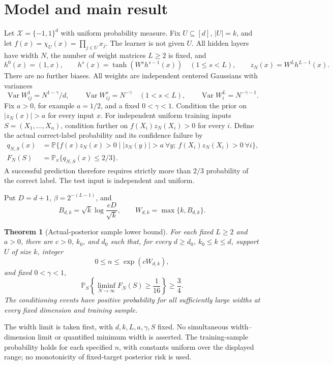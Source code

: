 \documentclass[11pt]{article}
\newtheorem{theorem}{Theorem}[section]
\theoremstyle{remark}\newtheorem{remark}[theorem]{Remark}
\DeclareMathOperator{\Var}{Var}
\begin{document}
\section{Model and main result}
Let $\mathcal X=\{-1,1\}^d$ with uniform probability measure.
Fix $U\subseteq[d]$, $|U|=k$, and let
$f(x)=\chi_U(x)=\prod_{j\in U}x_j$.
The learner is not given $U$. All hidden layers have width $N$, the
number of weight matrices $L\ge2$ is fixed, and
\[
 h^0(x)=(1,x),\qquad
 h^s(x)=\tanh(W^s h^{s-1}(x))\quad(1\le s<L),\qquad
 z_N(x)=W^L h^{L-1}(x).
\]
There are no further biases. All weights are independent centered
Gaussians with variances
\begin{equation}\label{eq:weights}
 \Var W^1_{ij}=N^{1-\gamma}/d,\qquad
 \Var W^s_{ij}=N^{-\gamma}\quad(1<s<L),\qquad
 \Var W^L_i=N^{-\gamma-1}.
\end{equation}
Fix $a>0$, for example $a=1/2$, and a fixed $0<\gamma<1$.
Condition the prior on $|z_N(x)|>a$ for every input $x$.
For independent uniform training inputs $S=(X_1,\ldots,X_n)$, condition
further on $f(X_i)z_N(X_i)>0$ for every $i$.
Define the actual correct-label probability and its confidence failure by
\begin{align*}
 q_{N,S}(x)&=\mathbb P\{f(x)z_N(x)>0\mid
 |z_N(y)|>a\ \forall y;\ f(X_i)z_N(X_i)>0\ \forall i\},\\
 F_N(S)&=\mathbb P_x\{q_{N,S}(x)\le2/3\}.
\end{align*}
A successful prediction therefore requires strictly more than $2/3$
probability of the correct label. The test input is independent and
uniform.

Put $D=d+1$, $\beta=2^{-(L-1)}$, and
\begin{equation}\label{eq:main-threshold}
 B_{d,k}=\sqrt{k}\log\frac{eD}{\sqrt{k}},\qquad
 W_{d,k}=\max\{k,B_{d,k}\}.
\end{equation}
\begin{theorem}[Actual-posterior sample lower bound]\label{thm:main}
For each fixed $L\ge2$ and $a>0$, there are $c>0$, $k_0$, and $d_0$
such that, for every $d\ge d_0$, $k_0\le k\le d$, support $U$ of
size $k$, integer
\[
 0\le n\le\exp(cW_{d,k}),
\]
and fixed $0<\gamma<1$,
\[
 \mathbb P_S\left\{\liminf_{N\to\infty}F_N(S)\ge\frac1{16}\right\}
 \ge\frac34.
\]
The conditioning events have positive probability for all sufficiently
large widths at every fixed dimension and training sample.
\end{theorem}

The width limit is taken first, with $d,k,L,a,\gamma,S$ fixed.
No simultaneous width--dimension limit or quantified minimum width is
asserted. The training-sample probability holds for each specified $n$,
with constants uniform over the displayed range; no monotonicity of
fixed-target posterior risk is used.
\end{document}
